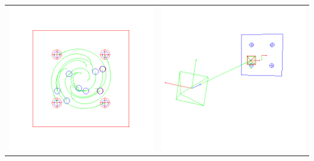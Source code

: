 {\begin{center}
\begin{tabular}{cc}
  \includegraphics[height=0.15\textheight]{figures/plots/ex4cimage.png}&
  \includegraphics[height=0.15\textheight]{figures/plots/ex4cscene.png}\\

\end{tabular}
\end{center}}
